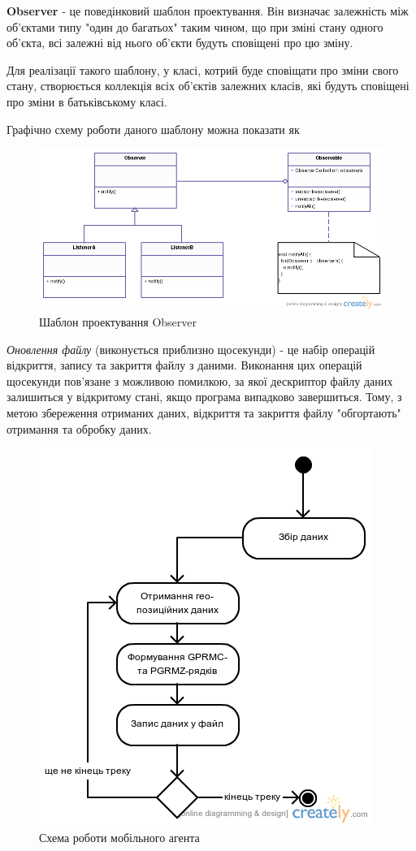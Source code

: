 \documentclass[simple,a4paper,14pt,ukrainian,utf8]{eskdtext}
\begin{document}
	\textbf{Observer} - це поведінковий шаблон проектування. Він визначає залежність між об’єктами типу "один до багатьох" таким чином, що при зміні стану одного об’єкта, всі залежні від нього об’єкти будуть сповіщені про цю зміну.
	
	Для реалізації такого шаблону, у класі, котрий буде сповіщати про зміни свого стану, створюється коллекція всіх об’єктів залежних класів, які будуть сповіщені про зміни в батьківському класі. 
	
	Графічно схему роботи даного шаблону можна показати як
	
	\begin{figure}
		\centering \includegraphics[scale=0.5]{images/observer_1_1.png}
		\caption{Шаблон проектування Observer}
	\end{figure}
	
	\textit{Оновлення файлу} (виконується приблизно щосекунди) - це набір операцій відкриття, запису та закриття файлу з даними. Виконання цих операцій щосекунди пов’язане з можливою помилкою, за якої дескриптор файлу даних залишиться у відкритому стані, якщо програма випадково завершиться. Тому, з метою збереження отриманих даних, відкриття та закриття файлу "обгортають" отримання та обробку даних.
	
	\vspace{2em}
	\begin{figure}
		\centering \includegraphics[scale=0.5]{images/mobile_agent_workflow.png}
		\caption{Схема роботи мобільного агента}
	\end{figure}
	    
\end{document}
